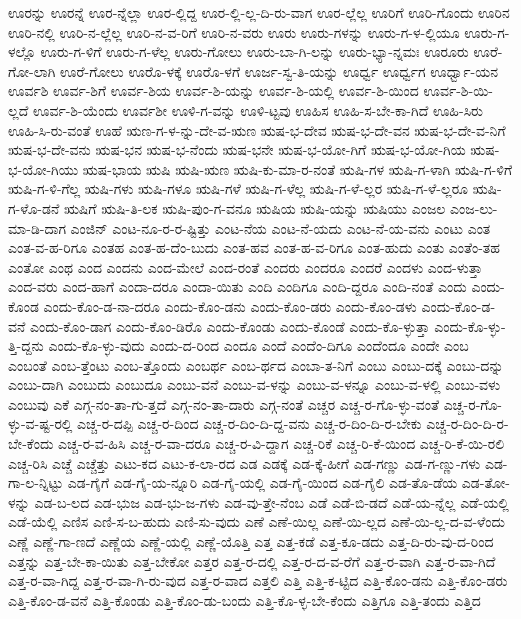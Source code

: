{ಊರನ್ನು
ಊರನ್ನೆ
ಊರ-ನ್ನೆಲ್ಲಾ
ಊರ-ಲ್ಲಿದ್ದ
ಊರ-ಲ್ಲಿ-ಲ್ಲ-ದಿ-ರು-ವಾಗ
ಊರ-ಲ್ಲೆಲ್ಲ
ಊರಿಗೆ
ಊರಿ-ಗೊಂದು
ಊರಿನ
ಊರಿ-ನಲ್ಲಿ
ಊರಿ-ನ-ಲ್ಲೆಲ್ಲ
ಊರಿ-ನ-ವ-ರಿಗೆ
ಊರಿ-ನ-ವರು
ಊರು
ಊರು-ಗಳನ್ನು
ಊರು-ಗ-ಳ-ಲ್ಲಿಯೂ
ಊರು-ಗ-ಳಲ್ಲೊ
ಊರು-ಗ-ಳಿಗೆ
ಊರು-ಗ-ಳೆಲ್ಲ
ಊರು-ಗೋಲು
ಊರು-ಬಾ-ಗಿ-ಲನ್ನು
ಊರು-ಭ್ಯಾ-ನ್ನಮಃ
ಊರೂರು
ಊರೆ-ಗೋ-ಲಾಗಿ
ಊರೆ-ಗೋಲು
ಊರೊ-ಳಕ್ಕೆ
ಊರೊ-ಳಗೆ
ಊರ್ಜ-ಸ್ವ-ತಿ-ಯನ್ನು
ಊರ್ಧ್ವ
ಊರ್ಧ್ವಗ
ಊರ್ಧ್ವಾ-ಯನ
ಊರ್ವಶಿ
ಊರ್ವ-ಶಿಗೆ
ಊರ್ವ-ಶಿಯ
ಊರ್ವ-ಶಿ-ಯನ್ನು
ಊರ್ವ-ಶಿ-ಯಲ್ಲಿ
ಊರ್ವ-ಶಿ-ಯಿಂದ
ಊರ್ವ-ಶಿ-ಯಿ-ಲ್ಲದೆ
ಊರ್ವ-ಶಿ-ಯೆಂದು
ಊರ್ವಶೀ
ಊಳಿ-ಗ-ವನ್ನು
ಊಳಿ-ಟ್ಟವು
ಊಹಿಸ
ಊಹಿ-ಸ-ಬೇ-ಕಾ-ಗಿದೆ
ಊಹಿ-ಸಿರು
ಊಹಿ-ಸಿ-ರು-ವಂತೆ
ಊಹೆ
ಋಣ-ಗ-ಳ-ನ್ನು-ದೇ-ವ-ಋಣ
ಋಷ-ಭ-ದೇವ
ಋಷ-ಭ-ದೇ-ವನ
ಋಷ-ಭ-ದೇ-ವ-ನಿಗೆ
ಋಷ-ಭ-ದೇ-ವನು
ಋಷ-ಭನ
ಋಷ-ಭ-ನೆಂದು
ಋಷ-ಭನೇ
ಋಷ-ಭ-ಯೋ-ಗಿಗೆ
ಋಷ-ಭ-ಯೋ-ಗಿಯ
ಋಷ-ಭ-ಯೋ-ಗಿಯು
ಋಷ-ಭಾಯ
ಋಷಿ
ಋಷಿ-ಋಣ
ಋಷಿ-ಕು-ಮಾ-ರ-ನಂತೆ
ಋಷಿ-ಗಳ
ಋಷಿ-ಗ-ಳಾಗಿ
ಋಷಿ-ಗ-ಳಿಗೆ
ಋಷಿ-ಗ-ಳಿ-ಗೆಲ್ಲ
ಋಷಿ-ಗಳು
ಋಷಿ-ಗಳೂ
ಋಷಿ-ಗಳೆ
ಋಷಿ-ಗ-ಳೆಲ್ಲ
ಋಷಿ-ಗ-ಳೆ-ಲ್ಲರ
ಋಷಿ-ಗ-ಳೆ-ಲ್ಲರೂ
ಋಷಿ-ಗ-ಳೊ-ಡನೆ
ಋಷಿಗೆ
ಋಷಿ-ತಿ-ಲಕ
ಋಷಿ-ಪುಂ-ಗ-ವನೂ
ಋಷಿಯ
ಋಷಿ-ಯನ್ನು
ಋಷಿಯು
ಎಂಜಲ
ಎಂಜ-ಲು-ಮಾ-ಡಿ-ದಾಗ
ಎಂಜಿನ್
ಎಂಟ-ನೂ-ರ-ರ-ಷ್ಟಿತ್ತು
ಎಂಟ-ನೆಯ
ಎಂಟ-ನೆ-ಯದು
ಎಂಟ-ನೆ-ಯ-ವನು
ಎಂಟು
ಎಂತ
ಎಂತ-ವ-ಹ-ರಿಗೂ
ಎಂತಹ
ಎಂತ-ಹ-ದೆಂ-ಬುದು
ಎಂತ-ಹವ
ಎಂತ-ಹ-ವ-ರಿಗೂ
ಎಂತ-ಹುದು
ಎಂತು
ಎಂತೆಂ-ತಹ
ಎಂತೋ
ಎಂಥ
ಎಂದ
ಎಂದನು
ಎಂದ-ಮೇಲೆ
ಎಂದ-ರಂತೆ
ಎಂದರು
ಎಂದರೂ
ಎಂದರೆ
ಎಂದಳು
ಎಂದ-ಳುತ್ತಾ
ಎಂದ-ವರು
ಎಂದ-ಹಾಗೆ
ಎಂದಾ-ದರೂ
ಎಂದಾ-ಯಿತು
ಎಂದಿ
ಎಂದಿಗೂ
ಎಂದಿ-ದ್ದರೂ
ಎಂದಿ-ನಂತೆ
ಎಂದು
ಎಂದು-ಕೊಂಡ
ಎಂದು-ಕೊಂ-ಡ-ನಾ-ದರೂ
ಎಂದು-ಕೊಂ-ಡನು
ಎಂದು-ಕೊಂ-ಡರು
ಎಂದು-ಕೊಂ-ಡಳು
ಎಂದು-ಕೊಂ-ಡ-ವನೆ
ಎಂದು-ಕೊಂ-ಡಾಗ
ಎಂದು-ಕೊಂ-ಡಿರೊ
ಎಂದು-ಕೊಂಡು
ಎಂದು-ಕೊಂಡೆ
ಎಂದು-ಕೊ-ಳ್ಳುತ್ತಾ
ಎಂದು-ಕೊ-ಳ್ಳು-ತ್ತಿ-ದ್ದನು
ಎಂದು-ಕೊ-ಳ್ಳು-ವುದು
ಎಂದು-ದ-ರಿಂದ
ಎಂದೂ
ಎಂದೆ
ಎಂದೆಂ-ದಿಗೂ
ಎಂದೆಂದೂ
ಎಂದೇ
ಎಂಬ
ಎಂಬಂತೆ
ಎಂಬ-ತ್ತೆಂಟು
ಎಂಬ-ತ್ತೊಂದು
ಎಂಬರ್ಥ
ಎಂಬ-ರ್ಥದ
ಎಂಬಾ-ತ-ನಿಗೆ
ಎಂಬು
ಎಂಬು-ದಕ್ಕೆ
ಎಂಬು-ದನ್ನು
ಎಂಬು-ದಾಗಿ
ಎಂಬುದು
ಎಂಬುದೂ
ಎಂಬು-ವನೆ
ಎಂಬು-ವ-ಳನ್ನು
ಎಂಬು-ವ-ಳನ್ನೂ
ಎಂಬು-ವ-ಳಲ್ಲಿ
ಎಂಬು-ವಳು
ಎಂಬುವು
ಎಕೆ
ಎಗ್ಗ-ನಂ-ತಾ-ಗು-ತ್ತದೆ
ಎಗ್ಗ-ನಂ-ತಾ-ದಾರು
ಎಗ್ಗ-ನಂತೆ
ಎಚ್ಚರ
ಎಚ್ಚ-ರ-ಗೊ-ಳ್ಳು-ವಂತೆ
ಎಚ್ಚ-ರ-ಗೊ-ಳ್ಳು-ವ-ಷ್ಟ-ರಲ್ಲಿ
ಎಚ್ಚ-ರ-ದಪ್ಪಿ
ಎಚ್ಚ-ರ-ದಿಂದ
ಎಚ್ಚ-ರ-ದಿಂ-ದಿ-ದ್ದ-ವನು
ಎಚ್ಚ-ರ-ದಿಂ-ದಿ-ರ-ಬೇಕು
ಎಚ್ಚ-ರ-ದಿಂ-ದಿ-ರ-ಬೇ-ಕೆಂದು
ಎಚ್ಚ-ರ-ವ-ಹಿಸಿ
ಎಚ್ಚ-ರ-ವಾ-ದರೂ
ಎಚ್ಚ-ರ-ವಿ-ದ್ದಾಗ
ಎಚ್ಚ-ರಿಕೆ
ಎಚ್ಚ-ರಿ-ಕೆ-ಯಿಂದ
ಎಚ್ಚ-ರಿ-ಕೆ-ಯಿ-ರಲಿ
ಎಚ್ಚ-ರಿಸಿ
ಎಚ್ಚೆ
ಎಚ್ಚೆತ್ತು
ಎಟು-ಕದ
ಎಟು-ಕ-ಲಾ-ರದ
ಎಡ
ಎಡಕ್ಕೆ
ಎಡ-ಕ್ಕೆ-ಹೀಗೆ
ಎಡ-ಗಣ್ಣು
ಎಡ-ಗ-ಣ್ಣು-ಗಳು
ಎಡ-ಗಾ-ಲ-ನ್ನಿಟ್ಟು
ಎಡ-ಗೈಗೆ
ಎಡ-ಗೈ-ಯ-ನ್ನೂರಿ
ಎಡ-ಗೈ-ಯಲ್ಲಿ
ಎಡ-ಗೈ-ಯಿಂದ
ಎಡ-ಗೈಲಿ
ಎಡ-ತೊ-ಡೆಯ
ಎಡ-ತೋ-ಳನ್ನು
ಎಡ-ಬ-ಲದ
ಎಡ-ಭುಜ
ಎಡ-ಭು-ಜ-ಗಳು
ಎಡ-ವು-ತ್ತೇ-ನೆಂಬ
ಎಡೆ
ಎಡೆ-ಬಿ-ಡದೆ
ಎಡೆ-ಯ-ನ್ನೆಲ್ಲ
ಎಡೆ-ಯಲ್ಲಿ
ಎಡೆ-ಯೆಲ್ಲಿ
ಎಣಿಸ
ಎಣಿ-ಸ-ಬ-ಹುದು
ಎಣಿ-ಸು-ವುದು
ಎಣೆ
ಎಣೆ-ಯಿಲ್ಲ
ಎಣೆ-ಯಿ-ಲ್ಲದ
ಎಣೆ-ಯಿ-ಲ್ಲ-ದ-ವ-ಳೆಂದು
ಎಣ್ಣೆ
ಎಣ್ಣೆ-ಗಾ-ಣದೆ
ಎಣ್ಣೆಯ
ಎಣ್ಣೆ-ಯಲ್ಲಿ
ಎಣ್ಣೆ-ಯೊತ್ತಿ
ಎತ್ತ
ಎತ್ತ-ಕಡೆ
ಎತ್ತ-ಕೂ-ಡದು
ಎತ್ತ-ದಿ-ರು-ವು-ದ-ರಿಂದ
ಎತ್ತನ್ನು
ಎತ್ತ-ಬೇ-ಕಾ-ಯಿತು
ಎತ್ತ-ಬೇಕೋ
ಎತ್ತರ
ಎತ್ತ-ರ-ದಲ್ಲಿ
ಎತ್ತ-ರ-ದ-ವ-ರೆಗೆ
ಎತ್ತ-ರ-ವಾಗಿ
ಎತ್ತ-ರ-ವಾ-ಗಿದೆ
ಎತ್ತ-ರ-ವಾ-ಗಿದ್ದ
ಎತ್ತ-ರ-ವಾ-ಗಿ-ರು-ವುದ
ಎತ್ತ-ರ-ವಾದ
ಎತ್ತಲಿ
ಎತ್ತಿ
ಎತ್ತಿ-ಕ-ಟ್ಟಿದ
ಎತ್ತಿ-ಕೊಂ-ಡನು
ಎತ್ತಿ-ಕೊಂ-ಡರು
ಎತ್ತಿ-ಕೊಂ-ಡ-ವನೆ
ಎತ್ತಿ-ಕೊಂಡು
ಎತ್ತಿ-ಕೊಂ-ಡು-ಬಂದು
ಎತ್ತಿ-ಕೊ-ಳ್ಳ-ಬೇ-ಕೆಂದು
ಎತ್ತಿಗೂ
ಎತ್ತಿ-ತಂದು
ಎತ್ತಿದ
}
